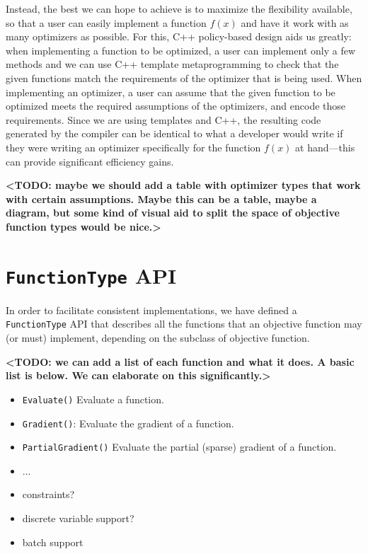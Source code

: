 \documentclass{article}
\begin{document}
Instead, the best we can hope to achieve is to maximize the flexibility
available, so that a user can easily implement a function $f(x)$ and have it
work with as many optimizers as possible.  For this, C++ policy-based design
aids us greatly: when implementing a function to be optimized, a user can
implement only a few methods and we can use C++ template metaprogramming to
check that the given functions match the requirements of the optimizer that is
being used.  When implementing an optimizer, a user can assume that the given
function to be optimized meets the required assumptions of the optimizers, and
encode those requirements.  Since we are using templates and C++, the resulting
code generated by the compiler can be identical to what a developer would write
if they were writing an optimizer specifically for the function $f(x)$ at
hand---this can provide significant efficiency gains.

{\bf <TODO: maybe we should add a table with optimizer types that work with
certain assumptions.  Maybe this can be a table, maybe a diagram, but some kind
of visual aid to split the space of objective function types would be nice.>}

\section{{\tt FunctionType} API}

In order to facilitate consistent implementations, we have defined a {\tt
FunctionType} API that describes all the functions that an objective function
may (or must) implement, depending on the subclass of objective function.

{\bf <TODO: we can add a list of each function and what it does.  A basic list
is below.  We can elaborate on this significantly.>}

\begin{itemize}
  \item {\tt Evaluate()} Evaluate a function.
  \item {\tt Gradient()}: Evaluate the gradient of a function.

  \item {\tt PartialGradient()} Evaluate the partial (sparse) gradient of a
      function.

  \item ...
  \item constraints?
  \item discrete variable support?
  \item batch support
\end{itemize}
\end{document}
